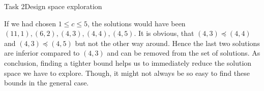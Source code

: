 \begin{frame}{Task 2}{Design space exploration}
    \begin{Sidenote}
    If we had chosen $1 \leq c \leq 5$, the solutions would have been $(11, 1), (6, 2), (4, 3), (4, 4), (4,5)$. It is obvious, that $(4, 3) \preceq (4, 4)$ and $(4, 3) \preceq (4, 5)$ but not the other way around. Hence the last two solutions are inferior compared to $(4, 3)$ and can be removed from the set of solutions. As conclusion, finding a tighter bound helps us to immediately reduce the solution space we have to explore. Though, it might not always be so easy to find these bounds in the general case.
    \end{Sidenote}
\end{frame}
